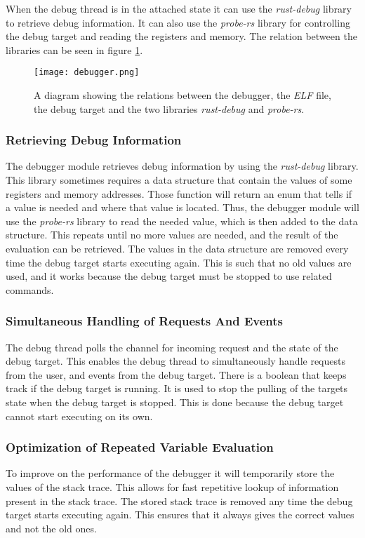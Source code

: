When the debug thread is in the attached state it can use the \emph{rust-debug} library to retrieve debug information.
It can also use the \emph{probe-rs} library for controlling the debug target and reading the registers and memory.
The relation between the libraries can be seen in figure \ref{fig:debugger}.


\begin{figure}[h]
	\centering
	\texttt{[image: debugger.png]}
	\caption{A diagram showing the relations between the debugger, the \emph{ELF} file, the debug target and the two libraries \emph{rust-debug} and \emph{probe-rs}.}
	\label{fig:debugger}
\end{figure}


\subsubsection{Retrieving Debug Information}
The debugger module retrieves debug information by using the \emph{rust-debug} library.
This library sometimes requires a data structure that contain the values of some registers and memory addresses.
Those function will return an enum that tells if a value is needed and where that value is located.
Thus, the debugger module will use the \emph{probe-rs} library to read the needed value, which is then added to the data structure.
This repeats until no more values are needed, and the result of the evaluation can be retrieved.
The values in the data structure are removed every time the debug target starts executing again.
This is such that no old values are used, and it works because the debug target must be stopped to use related commands.



\subsubsection{Simultaneous Handling of Requests And Events}
The debug thread polls the channel for incoming request and the state of the debug target.
This enables the debug thread to simultaneously handle requests from the user, and events from the debug target.
There is a boolean that keeps track if the debug target is running.
It is used to stop the pulling of the targets state when the debug target is stopped.
This is done because the debug target cannot start executing on its own.


\subsubsection{Optimization of Repeated Variable Evaluation}
To improve on the performance of the debugger it will temporarily store the values of the stack trace.
This allows for fast repetitive lookup of information present in the stack trace.
The stored stack trace is removed any time the debug target starts executing again.
This ensures that it always gives the correct values and not the old ones.


